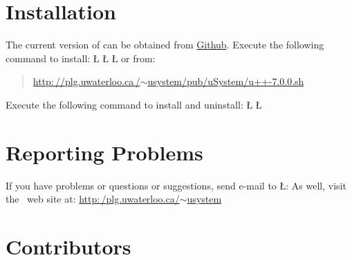 \documentclass[openright,twoside]{report}
\begin{document}
\section{Installation}

The current version of \uC can be obtained from \href{https://github.com/pabuhr/uCPP}{Github}.
Execute the following command to install:
\LGinlinefalse\LGbegin\lgrinde
\L{}
\L{}
\L{}
\endlgrinde\LGend
or from:
\begin{quote}
\href{http://plg.uwaterloo.ca/~usystem/pub/uSystem/u++-7.0.0.sh}{\textsf{http:\,//\hspace{0.1ex}plg.uwaterloo.ca\,/$\sim$usystem/pub/uSystem/u++-7.0.0.sh}}
\end{quote}
Execute the following command to install and uninstall:
\LGinlinefalse\LGbegin\lgrinde
\L{}
\L{}
\endlgrinde\LGend


\section{Reporting Problems}

If you have problems or questions or suggestions, send e-mail to \LGinlinetrue\LGbegin\lgrinde\L{}\endlgrinde\LGend{}:
As well, visit the \uS\ web site at: \href{http://plg.uwaterloo.ca/~usystem}{\textsf{http:\,/\hspace{0.1ex}plg.uwaterloo.ca/$\sim$usystem}}


\section{Contributors}
\end{document}

